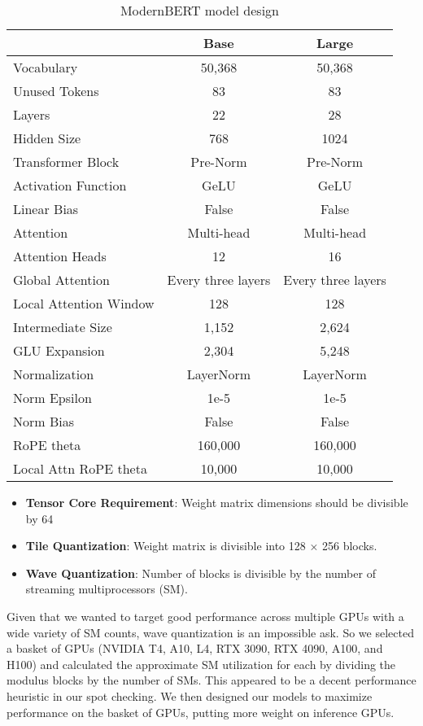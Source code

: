 \documentclass[11pt]{article}
\begin{document}
\begin{table*}[!t]
\small
\centering
\begin{tabular}{lcc}
\toprule
 & Base & Large \\
\midrule
Vocabulary & 50,368 & 50,368 \\
Unused Tokens & 83 & 83 \\
Layers & 22 & 28 \\
Hidden Size & 768 & 1024 \\
Transformer Block & Pre-Norm & Pre-Norm \\
Activation Function & GeLU & GeLU\\
Linear Bias & False & False\\
Attention & Multi-head & Multi-head \\
Attention Heads & 12 & 16 \\
Global Attention & Every three layers & Every three layers \\
Local Attention Window & 128 & 128 \\
Intermediate Size & 1,152 & 2,624 \\
GLU Expansion & 2,304 & 5,248 \\
Normalization & LayerNorm & LayerNorm \\
Norm Epsilon & 1e-5 & 1e-5 \\
Norm Bias & False & False \\
RoPE theta & 160,000 & 160,000 \\
Local Attn RoPE theta & 10,000 & 10,000 \\
\bottomrule
\end{tabular}
\caption{ModernBERT model design}  
\label{tab:modeldesign}
\end{table*}

\begin{itemize}
\item \textbf{Tensor Core Requirement}: Weight matrix dimensions should be divisible by 64
\item \textbf{Tile Quantization}: Weight matrix is divisible into 128 × 256 blocks.
\item \textbf{Wave Quantization}: Number of blocks is divisible by the number of streaming multiprocessors (SM).
\end{itemize}

Given that we wanted to target good performance across multiple GPUs with a wide variety of SM counts, wave quantization is an impossible ask. So we selected a basket of GPUs (NVIDIA T4, A10, L4, RTX 3090, RTX 4090, A100, and H100) and calculated the approximate SM utilization for each by dividing the modulus blocks by the number of SMs. This appeared to be a decent performance heuristic in our spot checking. We then designed our models to maximize performance on the basket of GPUs, putting more weight on inference GPUs.
\end{document}
